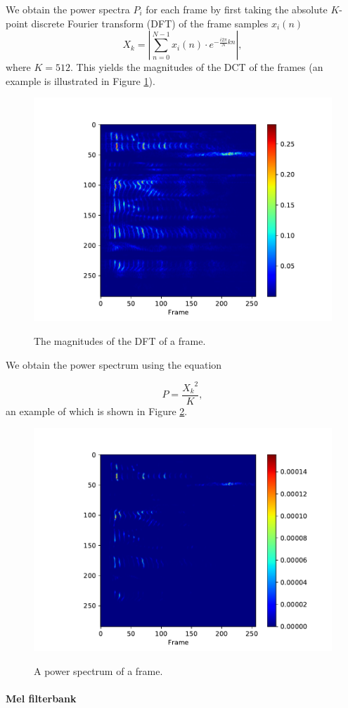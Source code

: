 			We obtain the power spectra $P_i$ for each frame by first taking the absolute $K$-point discrete Fourier transform (DFT) of the frame samples $x_i(n)$
			\begin{equation}\label{eq:magframes}
				X_k = \left|\sum_{n=0}^{N-1}x_i(n)\cdot e^{-\frac{i2\pi}{N}kn}\right|,
			\end{equation}
			where $K=512$.
			This yields the magnitudes of the DCT of the frames (an example is illustrated in Figure \ref{fig:magframes}).
			\begin{figure}[ht]
				\centering
			    \includegraphics[width=.45\linewidth]{gfx/magframes}
			    \label{fig:magframes}
			    \caption{The magnitudes of the DFT of a frame.}
			\end{figure}

			We obtain the power spectrum using the equation

			\begin{equation}\label{eq:powframes}
				P = \frac{{X_k}^2}{K},
			\end{equation}
			an example of which is shown in Figure \ref{fig:powframes}.

			\begin{figure}[ht]
				\centering
			    \includegraphics[width=.45\linewidth]{gfx/powframes}
			    \label{fig:powframes}
			    \caption{A power spectrum of a frame.}
			\end{figure}

		\paragraph{Mel filterbank}

